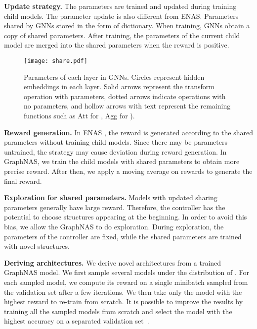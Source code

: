 \documentclass{article}
\begin{document}
\textbf{Update strategy.}  The parameters  are trained and updated during training child models. The parameter update is also different from ENAS.  Parameters shared by GNNs stored in the form of dictionary. When training, GNNs obtain a copy of shared parameters. After training, the parameters of the current child model are merged into the shared parameters  when the reward is positive.





\label{Parameters share}
\begin{figure}
	\texttt{[image: share.pdf]}
	\caption{Parameters of each layer in GNNs. Circles represent hidden embeddings in each layer. Solid arrows represent the transform operation with parameters, dotted arrows indicate operations with no parameters, and hollow arrows with text represent the remaining functions such as Att for , Agg for ).}
	\label{fig:parametersharing}
\end{figure}




\textbf{Reward generation.}
In ENAS \cite{ENAS}, the reward is generated according to the shared parameters without training child models.
Since there may be parameters untrained, the strategy may cause deviation during reward generation. In GraphNAS, we train the child models with shared parameters to obtain more precise reward. After then, we apply a moving average on rewards to generate the final reward.

\textbf{Exploration for shared parameters.}
Models with updated sharing parameters generally have large reward. Therefore, the controller has the potential to choose structures appearing at the beginning.
In order to avoid this bias, we allow the GraphNAS to do exploration. During exploration, the parameters  of the controller are fixed, while the shared parameters  are trained with novel structures.

\textbf{Deriving architectures.}
We derive novel architectures from a trained GraphNAS model. We first sample several models under the distribution of . For each sampled model, we compute its reward on a single minibatch sampled from the validation set after a few iterations. We then take only the model with the highest reward to re-train from scratch. It is possible to improve the results by training all the sampled models from scratch and select the model with the highest accuracy on a separated validation set~\cite{NAS,Zoph2018LearningTA}.
\end{document}
